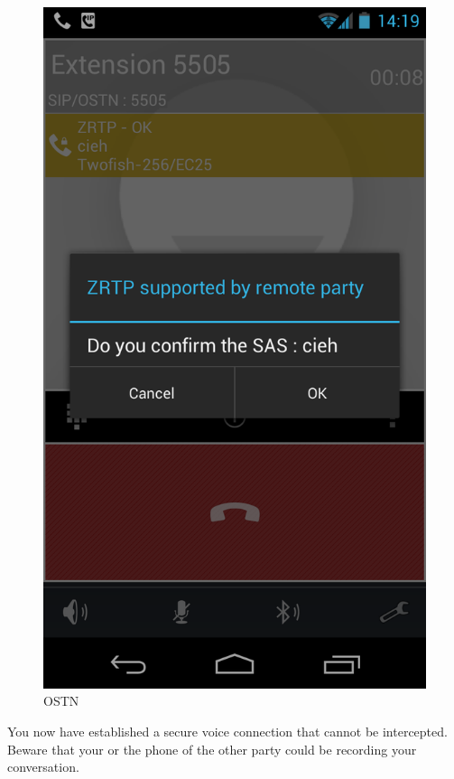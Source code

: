 \begin{figure}[htbp]
\centering
\includegraphics{ostn_3.png}
\caption{OSTN}
\end{figure}

You now have established a secure voice connection that cannot be
intercepted. Beware that your or the phone of the other party could be
recording your conversation.
